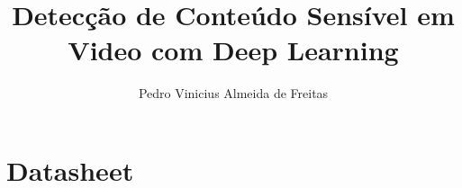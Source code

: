 \documentclass[phd,american]{ThesisPUC}
\author{Pedro Vinicius Almeida de Freitas}
\title{Detecção de Conteúdo Sensível em Video com Deep Learning}
\begin{document}








\arial


\normalfont
\appendix

\chapter{Datasheet}\label{chap:datasheet}



\end{document}
